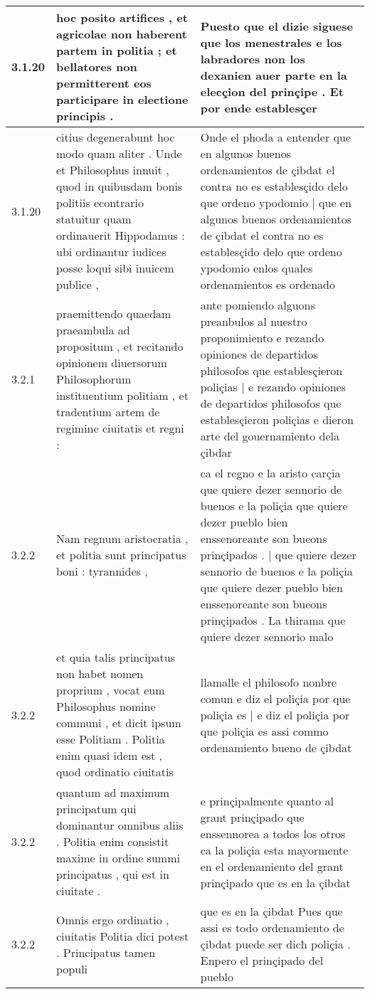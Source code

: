 \begin{tabular}{|p{1cm}|p{6.5cm}|p{6.5cm}|}
3.1.20 & hoc posito artifices , et agricolae non haberent partem in politia ; et bellatores non permitterent eos participare in electione principis . & Puesto que el dizie siguese que los menestrales e los labradores non los dexanien auer parte en la elecçion del prinçipe . Et por ende establesçer \\\hline
3.1.20 & citius degenerabunt hoc modo quam aliter . Unde et Philosophus innuit , quod in quibusdam bonis politiis econtrario statuitur quam ordinauerit Hippodamus : ubi ordinantur iudices posse loqui sibi inuicem publice , & Onde el phoda a entender que en algunos buenos ordenamientos de çibdat el contra no es establesçido delo que ordeno ypodomio | que en algunos buenos ordenamientos de çibdat el contra no es establesçido delo que ordeno ypodomio enlos quales ordenamientos es ordenado \\\hline
3.2.1 & praemittendo quaedam praeambula ad propositum , et recitando opinionem diuersorum Philosophorum instituentium politiam , et tradentium artem de regimine ciuitatis et regni : & ante pomiendo alguons preanbulos al nuestro proponimiento e rezando opiniones de departidos philosofos que establesçieron poliçias | e rezando opiniones de departidos philosofos que establesçieron poliçias e dieron arte del gouernamiento dela çibdar \\\hline
3.2.2 & Nam regnum aristocratia , et politia sunt principatus boni : tyrannides , & ca el regno e la aristo carçia que quiere dezer sennorio de buenos e la poliçia que quiere dezer pueblo bien enssenoreante son bueons prinçipados . | que quiere dezer sennorio de buenos e la poliçia que quiere dezer pueblo bien enssenoreante son bueons prinçipados . La thirama que quiere dezer sennorio malo \\\hline
3.2.2 & et quia talis principatus non habet nomen proprium , vocat eum Philosophus nomine communi , et dicit ipsum esse Politiam . Politia enim quasi idem est , quod ordinatio ciuitatis & llamalle el philosofo nonbre comun e diz el poliçia por que poliçia es | e diz el poliçia por que poliçia es assi commo ordenamiento bueno de çibdat \\\hline
3.2.2 & quantum ad maximum principatum qui dominantur omnibus aliis . Politia enim consistit maxime in ordine summi principatus , qui est in ciuitate . & e prinçipalmente quanto al grant prinçipado que enssennorea a todos los otros ca la poliçia esta mayormente en el ordenamiento del grant prinçipado que es en la çibdat \\\hline
3.2.2 & Omnis ergo ordinatio , ciuitatis Politia dici potest . Principatus tamen populi & que es en la çibdat Pues que assi es todo ordenamiento de çibdat puede ser dicħ poliçia . Enpero el prinçipado del pueblo \\\hline

\end{tabular}
